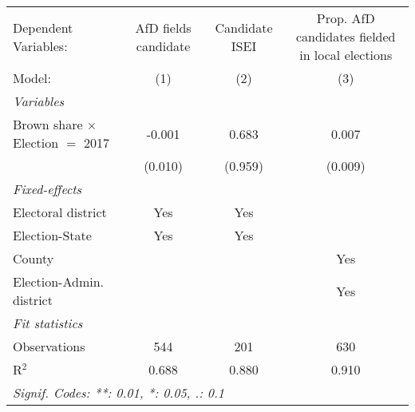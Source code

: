 \begingroup
\centering
\begin{tabular}{lccc}
   \tabularnewline \midrule \midrule
   Dependent Variables:                    & AfD fields candidate & Candidate ISEI & Prop. AfD candidates fielded in local elections\\  
   Model:                                  & (1)                  & (2)            & (3)\\  
   \midrule
   \emph{Variables}\\
   Brown share $\times$ Election $=$ 2017  & -0.001               & 0.683          & 0.007\\   
                                           & (0.010)              & (0.959)        & (0.009)\\   
   \midrule
   \emph{Fixed-effects}\\
   Electoral district                      & Yes                  & Yes            & \\  
   Election-State                          & Yes                  & Yes            & \\  
   County                                  &                      &                & Yes\\  
   Election-Admin. district                &                      &                & Yes\\  
   \midrule
   \emph{Fit statistics}\\
   Observations                            & 544                  & 201            & 630\\  
   R$^2$                                   & 0.688                & 0.880          & 0.910\\  
   \midrule \midrule
   \multicolumn{4}{l}{\emph{Signif. Codes: **: 0.01, *: 0.05, .: 0.1}}\\
\end{tabular}
\par\endgroup



